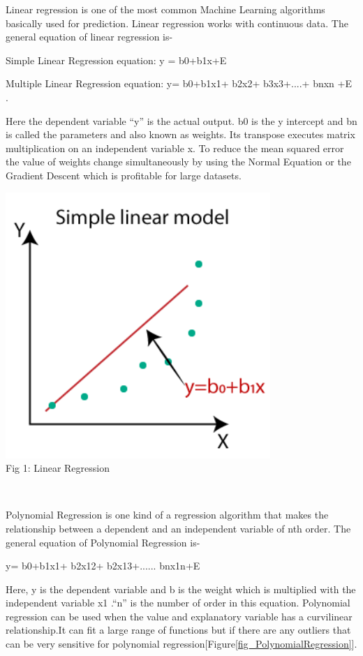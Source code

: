 \documentclass{IEEEtran}
\begin{document}
 Linear regression is one of the most common Machine Learning algorithms basically used for prediction. Linear regression works with continuous data. The general equation of linear regression is-

Simple Linear Regression equation:       y = b0+b1x+E

Multiple Linear Regression equation:     y= b0+b1x1+ b2x2+ b3x3+....+ bnxn +E \cite{Aa}.

Here the dependent variable “y” is the actual output. b0 is the y intercept and bn is called the parameters and also known as weights. Its transpose executes matrix multiplication on an independent variable x. To reduce the mean squared error the value of weights change simultaneously by using the Normal Equation or the Gradient Descent which is profitable for large datasets\cite{Vaddi2020}.

\begin{right}
\centering
\includegraphics[scale=1]{linear.PNG}
\\\caption{Fig 1: Linear Regression} \\

\end{right}

Polynomial Regression is one kind of a regression algorithm that makes the relationship between a dependent and an independent variable of nth order. The general equation of Polynomial Regression is-

y= b0+b1x1+ b2x12+ b2x13+...... bnx1n+E

Here, y is the dependent variable and b is the weight which is multiplied with the independent variable x1 \cite{Aa}.“n” is the number of order in this equation. Polynomial regression can be used when the value and explanatory variable has a curvilinear relationship\cite{Vaddi2020}.It can fit a large range of functions but if there are any outliers that can be very sensitive for polynomial regression\cite{Pant2019}[Figure\ref{fig_PolynomialRegression}].
\end{document}
